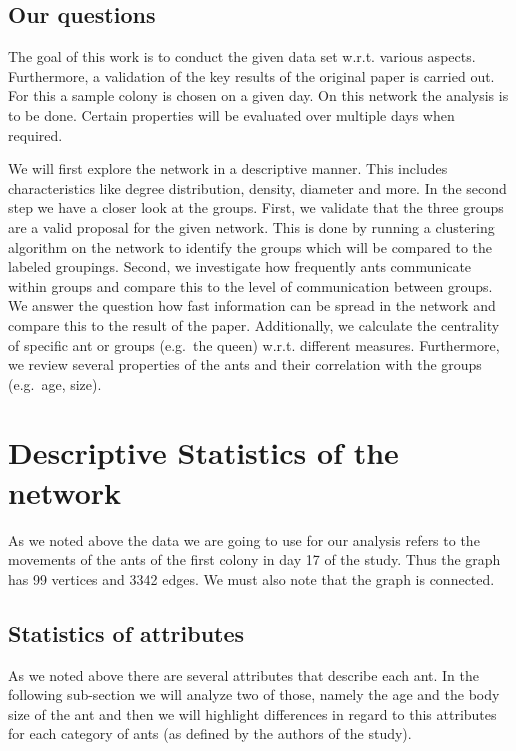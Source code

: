 \documentclass[
]{article}
\begin{document}
\hypertarget{our-questions}{%
\subsection{Our questions}\label{our-questions}}

The goal of this work is to conduct the given data set w.r.t. various
aspects. Furthermore, a validation of the key results of the original
paper is carried out. For this a sample colony is chosen on a given day.
On this network the analysis is to be done. Certain properties will be
evaluated over multiple days when required.

We will first explore the network in a descriptive manner. This includes
characteristics like degree distribution, density, diameter and more. In
the second step we have a closer look at the groups. First, we validate
that the three groups are a valid proposal for the given network. This
is done by running a clustering algorithm on the network to identify the
groups which will be compared to the labeled groupings. Second, we
investigate how frequently ants communicate within groups and compare
this to the level of communication between groups. We answer the
question how fast information can be spread in the network and compare
this to the result of the paper. Additionally, we calculate the
centrality of specific ant or groups (e.g.~the queen) w.r.t. different
measures. Furthermore, we review several properties of the ants and
their correlation with the groups (e.g.~age, size).

\hypertarget{descriptive-statistics-of-the-network}{%
\section{Descriptive Statistics of the
network}\label{descriptive-statistics-of-the-network}}

As we noted above the data we are going to use for our analysis refers
to the movements of the ants of the first colony in day 17 of the study.
Thus the graph has 99 vertices and 3342 edges. We must also note that
the graph is connected.

\hypertarget{statistics-of-attributes}{%
\subsection{Statistics of attributes}\label{statistics-of-attributes}}

As we noted above there are several attributes that describe each ant.
In the following sub-section we will analyze two of those, namely the
age and the body size of the ant and then we will highlight differences
in regard to this attributes for each category of ants (as defined by
the authors of the study).
\end{document}
